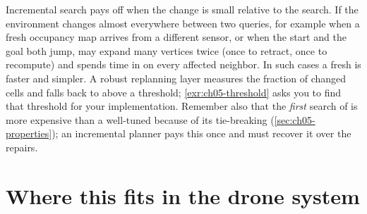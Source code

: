 \begin{pitfall}
Incremental search pays off when the change is small relative to the search. If the
environment changes almost everywhere between two queries, for example when a fresh
occupancy map arrives from a different sensor, or when the start and the goal both jump,
\dstarlite may expand many vertices twice (once to retract, once to recompute) and
spends time in \DslUpdateVertex on every affected neighbor. In such cases a fresh \astar
is faster and simpler. A robust replanning layer measures the fraction of changed cells
and falls back to \astar above a threshold; \cref{exr:ch05-threshold} asks you to find
that threshold for your implementation. Remember also that the \emph{first} search of
\dstarlite is more expensive than a well-tuned \astar because of its tie-breaking
(\cref{sec:ch05-properties}); an incremental planner pays this once and must recover it
over the repairs.
\end{pitfall}

\section{Where this fits in the drone system}
\label{sec:ch05-drone}

